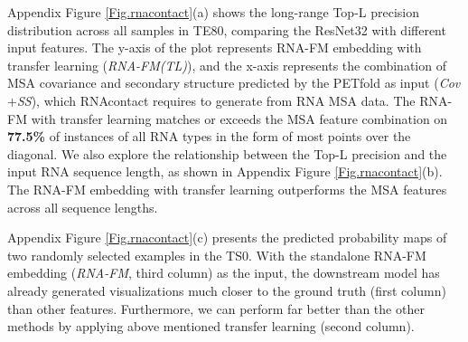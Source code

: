 Appendix Figure \ref{Fig.rnacontact}(a) shows the long-range Top-L precision distribution across all samples in TE80, comparing the ResNet32 with different input features. The y-axis of the plot represents RNA-FM embedding with transfer learning (\textit{RNA-FM(TL)}), and the x-axis represents the combination of MSA covariance and secondary structure predicted by the PETfold as input (\textit{Cov$+$SS}), which RNAcontact requires to generate from RNA MSA data. The RNA-FM with transfer learning matches or exceeds the MSA feature combination on \textbf{77.5\%} of instances of all RNA types in the form of most points over the diagonal. We also explore the relationship between the Top-L precision and the input RNA sequence length, as shown in Appendix Figure \ref{Fig.rnacontact}(b). The RNA-FM embedding with transfer learning outperforms the MSA features across all sequence lengths.


Appendix Figure \ref{Fig.rnacontact}(c) presents the predicted probability maps of two randomly selected examples in the TS0. With the standalone RNA-FM embedding (\textit{RNA-FM}, third column) as the input, the downstream model has already generated visualizations much closer to the ground truth (first column) than other features. Furthermore, we can perform far better than the other methods by applying above mentioned transfer learning (second column).


